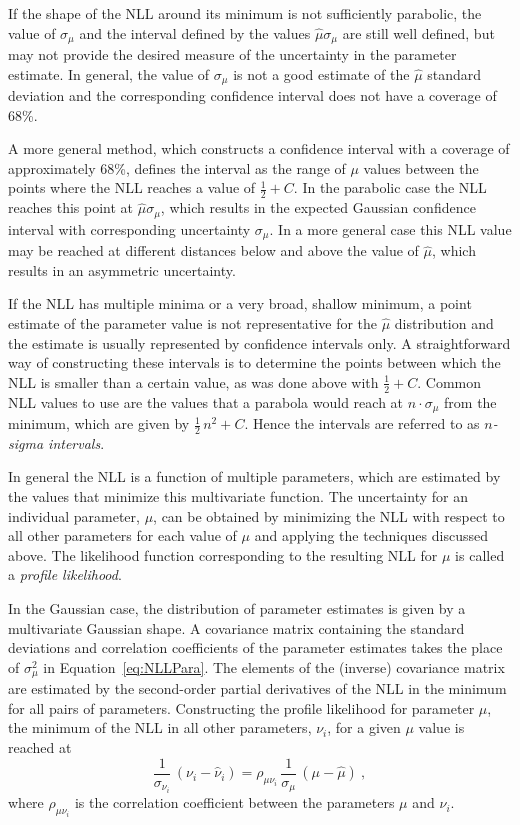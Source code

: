 If the shape of the NLL around its minimum is not sufficiently parabolic, the value of $\sigma_\mu$ and the interval defined by the values
$\hat{\mu}$\textpm$\sigma_\mu$ are still well defined, but may not provide the desired measure of the uncertainty in the parameter
estimate.  In general, the value of $\sigma_\mu$ is not a good estimate of the $\hat{\mu}$ standard deviation and the corresponding
confidence interval does not have a coverage of 68\%.

A more general method, which constructs a confidence interval with a coverage of approximately 68\%, defines the interval as the range of
$\mu$ values between the points where the NLL reaches a value of $\tfrac{1}{2}+C$. In the parabolic case the NLL reaches this point at
$\hat{\mu}$\textpm$\sigma_\mu$, which results in the expected Gaussian confidence interval with corresponding uncertainty $\sigma_\mu$. In
a more general case this NLL value may be reached at different distances below and above the value of $\hat{\mu}$, which results in an
asymmetric uncertainty.

If the NLL has multiple minima or a very broad, shallow minimum, a point estimate of the parameter value is not representative for the
$\hat{\mu}$ distribution and the estimate is usually represented by confidence intervals only. A straightforward way of constructing these
intervals is to determine the points between which the NLL is smaller than a certain value, as was done above with $\tfrac{1}{2}+C$. Common
NLL values to use are the values that a parabola would reach at $n\cdot\sigma_\mu$ from the minimum, which are given by
$\tfrac{1}{2}\,n^2+C$. Hence the intervals are referred to as \emph{$n$-sigma intervals}.

In general the NLL is a function of multiple parameters, which are estimated by the values that minimize this multivariate function.  The
uncertainty for an individual parameter, $\mu$, can be obtained by minimizing the NLL with respect to all other parameters for each value
of $\mu$ and applying the techniques discussed above. The likelihood function corresponding to the resulting NLL for $\mu$ is called a
\emph{profile likelihood}.

In the Gaussian case, the distribution of parameter estimates is given by a multivariate Gaussian shape. A covariance matrix containing the
standard deviations and correlation coefficients of the parameter estimates takes the place of $\sigma_\mu^2$ in Equation~\ref{eq:NLLPara}.
The elements of the (inverse) covariance matrix are estimated by the second-order partial derivatives of the NLL in the minimum for all
pairs of parameters. Constructing the profile likelihood for parameter $\mu$, the minimum of the NLL in all other parameters, $\nu_i$, for
a given $\mu$ value is reached at
\begin{equation}
  \frac{1}{\sigma_{\nu_i}}\, (\nu_i-\hat{\nu}_i)  = \rho_{\mu\nu_i}\, \frac{1}{\sigma_\mu}\, (\mu-\hat{\mu})\ ,
\end{equation}
where $\rho_{\mu\nu_i}$ is the correlation coefficient between the parameters $\mu$ and $\nu_i$.


